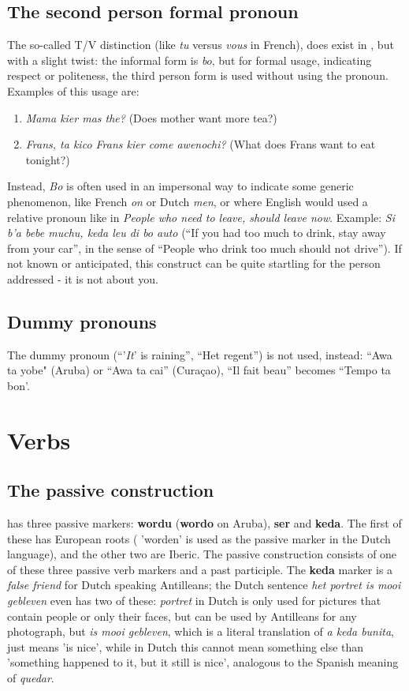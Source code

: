 \subsection{The second person formal pronoun}
The so-called T/V distinction (like \emph{tu} versus \emph{vous} in French), does exist in \pap{}, but with a slight twist: the informal form is \emph{bo}, but for formal usage, indicating respect or politeness, the third person form is used without using the pronoun. Examples of this usage are:
\begin{enumerate}
\item \emph{Mama kier mas the?} (Does mother want more tea?)
\item \emph{Frans, ta kico Frans kier come awenochi?} (What does Frans want to eat tonight?)
\end{enumerate}
Instead, \emph{Bo} is often used in an impersonal way to indicate some generic phenomenon, like French \emph{on} or Dutch \emph{men}, or where English would used a relative pronoun like in \emph{People who need to leave, should leave now}. Example: \emph{Si b'a bebe muchu, keda leu di bo auto} (``If you had too much to drink, stay away from your car'', in the sense of ``People who drink too much should not drive''). If not known or anticipated, this construct can be quite startling for the person addressed - it is not about you.

\subsection{Dummy pronouns}
The dummy pronoun (``'\emph{It}' is raining'', ``Het regent'') is not used, instead: ``Awa ta yobe" (Aruba) or ``Awa ta cai'' (Curaçao), ``Il fait beau'' becomes ``Tempo ta bon'.

\section{Verbs}
\subsection{The passive construction}
\pap{} has three passive markers: \textbf{wordu} (\textbf{wordo} on Aruba), \textbf{ser} and
\textbf{keda}. The first of these has European roots ( 'worden' is used as the
passive marker in the Dutch language), and the other two are Iberic. The passive construction consists of one of these three
passive verb markers and a past participle. The \textbf{keda} marker
is a \emph{false friend} for Dutch speaking Antilleans; the Dutch sentence
\emph{het portret is mooi gebleven} even has two of these: \emph{portret} in
Dutch is only used for pictures that contain people or only their
faces, but can be used by Antilleans for any photograph, but \emph{is mooi gebleven}, which is a literal translation of \emph{a
keda bunita}, just means 'is nice', while in Dutch this cannot mean
something else than 'something happened to it, but it still is nice',
analogous to the Spanish meaning of \emph{quedar}.

